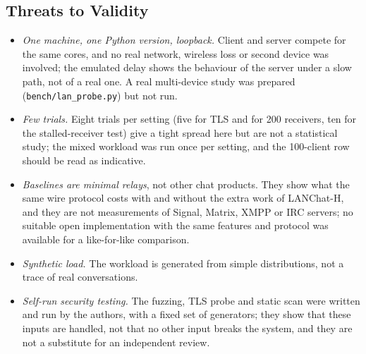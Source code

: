 \documentclass[conference]{IEEEtran}
\newcommand{\code}[1]{\texttt{#1}}
\begin{document}
\subsection{Threats to Validity}
\begin{itemize}
  \item \emph{One machine, one Python version, loopback.} Client and server compete for the same cores, and no real network, wireless loss or second device was involved; the emulated delay shows the behaviour of the server under a slow path, not of a real one. A real multi-device study was prepared (\code{bench/lan\_probe.py}) but not run.
  \item \emph{Few trials.} Eight trials per setting (five for TLS and for 200 receivers, ten for the stalled-receiver test) give a tight spread here but are not a statistical study; the mixed workload was run once per setting, and the 100-client row should be read as indicative.
  \item \emph{Baselines are minimal relays}, not other chat products. They show what the same wire protocol costs with and without the extra work of LANChat-H, and they are not measurements of Signal, Matrix, XMPP or IRC servers; no suitable open implementation with the same features and protocol was available for a like-for-like comparison.
  \item \emph{Synthetic load.} The workload is generated from simple distributions, not a trace of real conversations.
  \item \emph{Self-run security testing.} The fuzzing, TLS probe and static scan were written and run by the authors, with a fixed set of generators; they show that these inputs are handled, not that no other input breaks the system, and they are not a substitute for an independent review.
\end{itemize}

\end{document}
